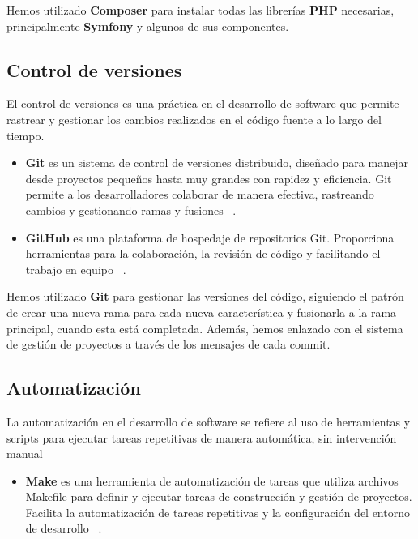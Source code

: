 Hemos utilizado  \textbf{Composer} para instalar todas las librerías  \textbf{PHP} necesarias, principalmente
\textbf{Symfony} y algunos de sus componentes.

\subsection*{Control de versiones}

El control de versiones es una práctica en el desarrollo de software que permite rastrear y gestionar los cambios
realizados en el código fuente a lo largo del tiempo.

\begin{itemize}
    \item \textbf{Git}
    es un sistema de control de versiones distribuido, diseñado para manejar desde proyectos pequeños hasta muy grandes
    con rapidez y eficiencia.
    Git permite a los desarrolladores colaborar de manera efectiva, rastreando cambios y gestionando ramas y fusiones
    ~\cite{url_git}.
    \item \textbf{GitHub} es una plataforma de hospedaje de repositorios Git.
    Proporciona herramientas para la colaboración, la revisión de código y facilitando el trabajo en equipo
    ~\cite{url_github}.
\end{itemize}

Hemos utilizado \textbf{Git} para gestionar las versiones del código, siguiendo el patrón de crear una nueva rama para
cada nueva característica y fusionarla a la rama principal, cuando esta está completada.
Además, hemos enlazado con el sistema de gestión de proyectos a través de los mensajes de cada commit.

\subsection*{Automatización}

La automatización en el desarrollo de software se refiere al uso de herramientas y scripts para ejecutar tareas
repetitivas de manera automática, sin intervención manual

\begin{itemize}
    \item \textbf{Make}
    es una herramienta de automatización de tareas que utiliza archivos Makefile para definir y ejecutar tareas de
    construcción y gestión de proyectos.
    Facilita la automatización de tareas repetitivas y la configuración del entorno de desarrollo
    ~\cite{url_make}.
\end{itemize}

